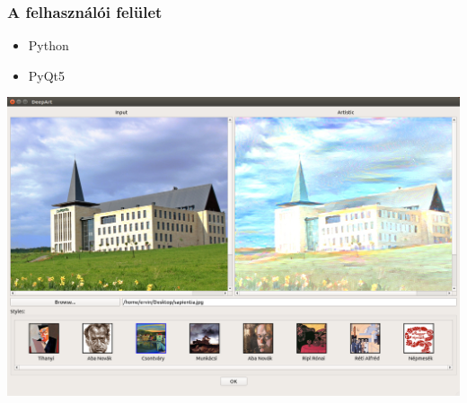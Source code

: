 \documentclass{beamer}
\begin{document}
	\begin{frame}
		\frametitle{A felhasználói felület}
		\begin{itemize}
			\item Python
			\item PyQt5
		\end{itemize}
		\begin{center}
			\includegraphics[scale=0.18]{main_ui.png}
		\end{center}
	\end{frame}
\end{document}
